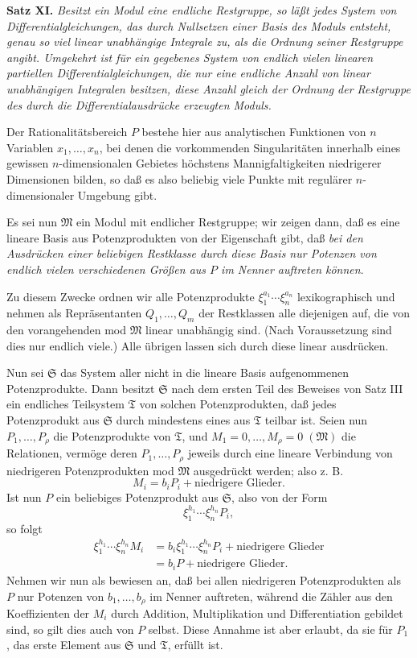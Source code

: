 \documentclass[11pt]{article}
\begin{document}
\textbf{Satz XI.} \emph{Besitzt ein Modul eine endliche Restgruppe, so läßt jedes System von Differentialgleichungen, das durch Nullsetzen einer Basis des Moduls entsteht, genau so viel linear unabhängige Integrale zu, als die Ordnung seiner Restgruppe angibt. Umgekehrt ist für ein gegebenes System von endlich vielen linearen partiellen Differentialgleichungen, die nur eine endliche Anzahl von linear unabhängigen Integralen besitzen, diese Anzahl gleich der Ordnung der Restgruppe des durch die Differentialausdrücke erzeugten Moduls.}

Der Rationalitätsbereich $P$ bestehe hier aus analytischen Funktionen von $n$ Variablen $x_1,
\ldots,x_n$, bei denen die vorkommenden Singularitäten innerhalb eines gewissen $n$-dimensionalen Gebietes höchstens Mannigfaltigkeiten niedrigerer Dimensionen bilden, so daß es also beliebig viele Punkte mit regulärer $n$-dimensionaler Umgebung gibt.

Es sei nun $\mathfrak M$ ein Modul mit endlicher Restgruppe; wir zeigen dann, daß es eine lineare Basis aus Potenzprodukten von der Eigenschaft gibt, daß \emph{bei den Ausdrücken einer beliebigen Restklasse durch diese Basis nur Potenzen von endlich vielen verschiedenen Größen aus $P$ im Nenner auftreten können}.

Zu diesem Zwecke ordnen wir alle Potenzprodukte $\xi_1^{a_1}\cdots\xi_n^{a_n}$ lexikographisch und nehmen als Repräsentanten $Q_1,
\ldots,Q_m$ der Restklassen alle diejenigen auf, die von den vorangehenden mod $\mathfrak M$ linear unabhängig sind. (Nach Voraussetzung sind dies nur endlich viele.) Alle übrigen lassen sich durch diese linear ausdrücken.

Nun sei $\mathfrak S$ das System aller nicht in die lineare Basis aufgenommenen Potenzprodukte. Dann besitzt $\mathfrak S$ nach dem ersten Teil des Beweises von Satz III ein endliches Teilsystem $\mathfrak T$ von solchen Potenzprodukten, daß jedes Potenzprodukt aus $\mathfrak S$ durch mindestens eines aus $\mathfrak T$ teilbar ist. Seien nun $P_1,
\ldots,P_\rho$ die Potenzprodukte von $\mathfrak T$, und $M_1=0,
\ldots,M_\rho=0\; (\mathfrak M)$ die Relationen, vermöge deren $P_1,
\ldots,P_\rho$ jeweils durch eine lineare Verbindung von niedrigeren Potenzprodukten mod $\mathfrak M$ ausgedrückt werden; also z. B.
\[
 M_i=b_iP_i+\text{niedrigere Glieder}.
\]
Ist nun $P$ ein beliebiges Potenzprodukt aus $\mathfrak S$, also von der Form
\[
 \xi_1^{h_1}\cdots\xi_n^{h_n}P_i,
\]
so folgt
\[
\begin{aligned}
 \xi_1^{h_1}\cdots\xi_n^{h_n}M_i
 &=b_i\xi_1^{h_1}\cdots\xi_n^{h_n}P_i+\text{niedrigere Glieder}\\
 &=b_iP+\text{niedrigere Glieder}.
\end{aligned}
\]
Nehmen wir nun als bewiesen an, daß bei allen niedrigeren Potenzprodukten als $P$ nur Potenzen von $b_1,
\ldots,b_\rho$ im Nenner auftreten, während die Zähler aus den Koeffizienten der $M_i$ durch Addition, Multiplikation und Differentiation gebildet sind, so gilt dies auch von $P$ selbst. Diese Annahme ist aber erlaubt, da sie für $P_1$, das erste Element aus $\mathfrak S$ und $\mathfrak T$, erfüllt ist.
\end{document}
